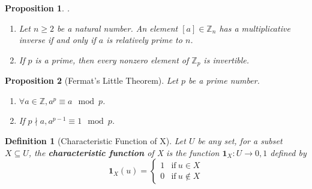 \documentclass[12pt]{article}
\newtheorem{definition}{Definition}[subsection]
\newtheorem{proposition}{Proposition}[subsection]
\begin{document}
    \begin{proposition}
        .\\
        \begin{enumerate}
            \item Let $n \geq 2$ be a natural number. An element $[a] \in \mathbb{Z}_n$ has a multiplicative inverse if and only if $a$ is relatively prime to $n$.
            \item If $p$ is a prime, then every nonzero element of $\mathbb{Z}_p$ is invertible.
        \end{enumerate}

    \end{proposition}
    \begin{proposition}[Fermat's Little Theorem]
        Let $p$ be a prime number.
        \begin{enumerate}
            \item $\forall a \in \mathbb{Z}, a^p \equiv a \mod p$.
            \item If $p \nmid a, a^{p-1} \equiv 1 \mod p$.
        \end{enumerate}

    \end{proposition}
    \begin{definition}[Characteristic Function of X]
        Let $U$ be any set, for a subset $X \subseteq U$, the \textbf{characteristic function} of X is the function $\textbf{1}_X:U\rightarrow {0,1}$ defined by 
        \begin{equation}
            \textbf{1}_X(u) = \left\{ \begin{array}{ll}1 & \mathrm{if\ }u \in X\\ 0 & \mathrm{if\ }u \notin X \end{array}\right.
        \end{equation}
    \end{definition}
\end{document}
